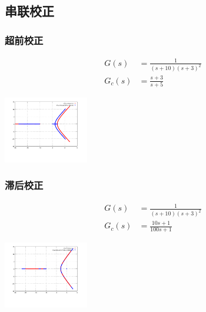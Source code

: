 \documentclass{article}
\begin{document}
\subsection{串联校正}
\label{sec-4-3}
\begin{frame}
\frametitle{超前校正}
\label{sec-4-3-1}

\begin{align*}
G(s) &=\frac{1}{(s+10)(s+3)^2}\\
G_c(s) &=\frac{s+3}{s+5}
\end{align*}

\includegraphics[width=10em]{image/lead.png}
\end{frame}
\begin{frame}
\frametitle{滞后校正}
\label{sec-4-3-2}

\begin{align*}
G(s) &=\frac{1}{(s+10)(s+3)^2}\\
G_c(s) &=\frac{10s+1}{100s+1}
\end{align*}

\includegraphics[width=10em]{image/lad.png}
\end{frame}
\end{document}
